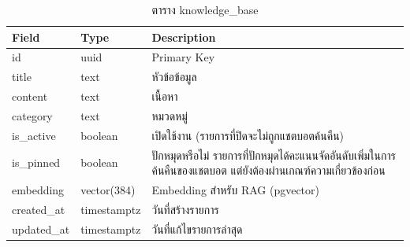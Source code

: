 \begin{table}[H]
\centering
\caption{ตาราง knowledge\_base}
\label{tab:db_kb}
\begin{tabular}{|p{3.6cm}|p{2.6cm}|p{6.8cm}|}
\hline
\textbf{Field} & \textbf{Type} & \textbf{Description} \\
\hline
id & uuid & Primary Key \\ \hline
title & text & หัวข้อข้อมูล \\ \hline
content & text & เนื้อหา \\ \hline
category & text & หมวดหมู่ \\ \hline
is\_active & boolean & เปิดใช้งาน (รายการที่ปิดจะไม่ถูกแชตบอตค้นคืน) \\ \hline
is\_pinned & boolean & ปักหมุดหรือไม่ รายการที่ปักหมุดได้คะแนนจัดอันดับเพิ่มในการค้นคืนของแชตบอต แต่ยังต้องผ่านเกณฑ์ความเกี่ยวข้องก่อน \\ \hline
embedding & vector(384) & Embedding สำหรับ RAG (pgvector) \\ \hline
created\_at & timestamptz & วันที่สร้างรายการ \\ \hline
updated\_at & timestamptz & วันที่แก้ไขรายการล่าสุด \\
\hline
\end{tabular}
\end{table}

